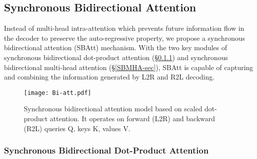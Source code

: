 \documentclass[11pt,a4paper]{article}
\begin{document}
\begin{CJK*}{UTF8}{gbsn}
\subsection{Synchronous Bidirectional Attention} \label{SBA-sec}

Instead of multi-head intra-attention which prevents future information flow in the decoder to preserve the auto-regressive property, we propose a synchronous bidirectional attention (SBAtt) mechanism.
With the two key modules of synchronous bidirectional dot-product attention (\S\ref{SBDPA-sec}) and synchronous bidirectional multi-head attention (\S\ref{SBMHA-sec}), SBAtt is capable of capturing and combining the information generated by L2R and R2L decoding.
 
\begin{figure}
    \centering
    \texttt{[image: Bi-att.pdf]}
    \caption{Synchronous bidirectional attention model based on scaled dot-product attention.
    It operates on forward (L2R) and backward (R2L) queries Q, keys K, values V.
    }\label{Bi-att}
\end{figure}

\subsubsection{Synchronous Bidirectional Dot-Product Attention} \label{SBDPA-sec}


\end{CJK*}
\end{document}
